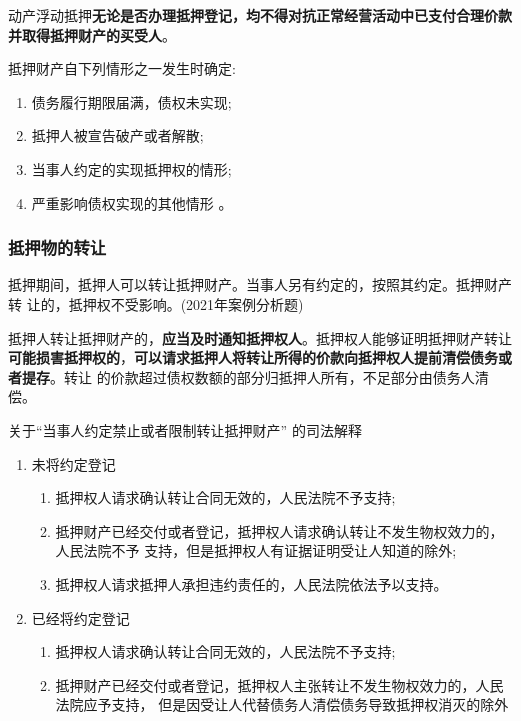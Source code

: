 \documentclass[UTF8,12pt]{ctexart}
\numberwithin{equation}{section} %
\numberwithin{figure}{section}
\numberwithin{table}{section}
\begin{document}
	动产浮动抵押\textbf{无论是否办理抵押登记，均不得对抗正常经营活动中已支付合理价款并取得抵押财产的买受人}。
	
	抵押财产自下列情形之一发生时确定:
	\begin{enumerate}
		\item 债务履行期限届满，债权未实现;
		
		\item 抵押人被宣告破产或者解散;
		
		\item 当事人约定的实现抵押权的情形;
		
		\item 严重影响债权实现的其他情形 。
	\end{enumerate}
	
	
	\subsubsection{抵押物的转让}

	抵押期间，抵押人可以转让抵押财产。当事人另有约定的，按照其约定。抵押财产转 让的，抵押权不受影响。(2021年案例分析题)
	
	抵押人转让抵押财产的，\textbf{应当及时通知抵押权人}。抵押权人能够证明抵押财产转让\textbf{可能损害抵押权的}，\textbf{可以请求抵押人将转让所得的价款向抵押权人提前清偿债务或者提存}。转让 的价款超过债权数额的部分归抵押人所有，不足部分由债务人清偿。
	
	关于“当事人约定禁止或者限制转让抵押财产” 的司法解释
	\begin{enumerate}
		\item 未将约定登记
		\begin{enumerate}
			\item 抵押权人请求确认转让合同无效的，人民法院不予支持; 
			
			\item 抵押财产已经交付或者登记，抵押权人请求确认转让不发生物权效力的，人民法院不予 支持，但是抵押权人有证据证明受让人知道的除外; 
			
			\item 抵押权人请求抵押人承担违约责任的，人民法院依法予以支持。
		\end{enumerate}
		
		\item 已经将约定登记
		\begin{enumerate}
			\item 抵押权人请求确认转让合同无效的，人民法院不予支持; 
			
			\item 抵押财产已经交付或者登记，抵押权人主张转让不发生物权效力的，人民法院应予支持， 但是因受让人代替债务人清偿债务导致抵押权消灭的除外
		\end{enumerate}
	\end{enumerate} 
	
\end{document}
